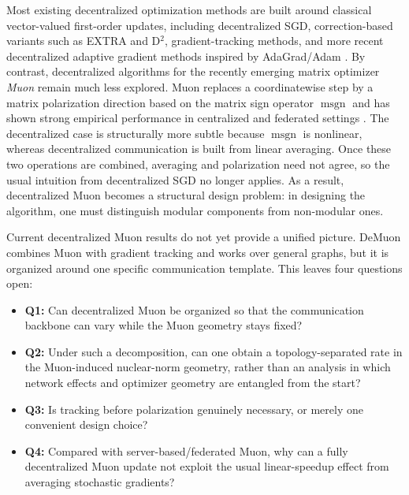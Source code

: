 \documentclass{article}
\begin{document}
Most existing decentralized optimization methods are built around classical vector-valued first-order updates, including decentralized SGD, correction-based variants such as EXTRA and D$^2$, gradient-tracking methods, and more recent decentralized adaptive gradient methods inspired by AdaGrad/Adam \citep{yang2019survey,lian2017can,shi2015extra,tang2018d,pu2021distributed,nazari2022dadam,chen2023convergence}. By contrast, decentralized algorithms for the recently emerging matrix optimizer \emph{Muon} \citep{jordan2024muon} remain much less explored. Muon replaces a coordinatewise step by a matrix polarization direction based on the matrix sign operator $\operatorname{msgn}$ and has shown strong empirical performance in centralized and federated settings \citep{jordan2024muon,liu2025muon,liu2025fedmuon,takezawa2025fedmuon}. The decentralized case is structurally more subtle because $\operatorname{msgn}$ is nonlinear, whereas decentralized communication is built from linear averaging. Once these two operations are combined, averaging and polarization need not agree, so the usual intuition from decentralized SGD no longer applies. As a result, decentralized Muon becomes a structural design problem: in designing the algorithm, one must distinguish modular components from non-modular ones.


Current decentralized Muon results do not yet provide a unified picture. DeMuon \citep{he2025demuon} combines Muon with gradient tracking and works over general graphs, but it is organized around one specific communication template. This leaves four questions open:
\begin{itemize}
    \item \textbf{Q1:} Can decentralized Muon be organized so that the communication backbone can vary while the Muon geometry stays fixed?
    \item \textbf{Q2:} Under such a decomposition, can one obtain a topology-separated rate in the Muon-induced nuclear-norm geometry, rather than an analysis in which network effects and optimizer geometry are entangled from the start?
    \item \textbf{Q3:} Is tracking before polarization genuinely necessary, or merely one convenient design choice?
    \item \textbf{Q4:} Compared with server-based/federated Muon, why can a fully decentralized Muon update not exploit the usual linear-speedup effect from averaging stochastic gradients?
\end{itemize}
\end{document}
